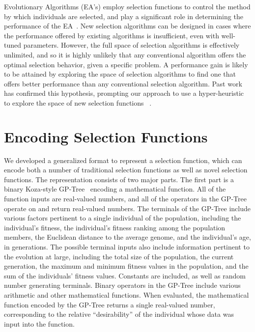 \documentclass[sigconf]{acmart}
\begin{document}
Evolutionary Algorithms (EA's) employ selection functions to control the method by which individuals are selected, and play a significant role in determining the performance of the EA~\citep{woodward2010metaBias}. New selection algorithms can be designed in cases where the performance offered by existing algorithms is insufficient, even with well-tuned parameters. However, the full space of selection algorithms is effectively unlimited, and so it is highly unlikely that any conventional algorithm offers the optimal selection behavior, given a specific problem. A performance gain is likely to be attained by exploring the space of selection algorithms to find one that offers better performance than any conventional selection algorithm. Past work has confirmed this hypothesis, prompting our approach to use a hyper-heuristic to explore the space of new selection functions ~\citep{woodward2011selection}.


\section{Encoding Selection Functions}
\label{Encoding Selection Functions}

We developed a generalized format to represent a selection function, which can encode both a number of traditional selection functions as well as novel selection functions. The representation consists of two major parts. The first part is a binary Koza-style GP-Tree~\citep{koza1994genetic} encoding a mathematical function. All of the function inputs are real-valued numbers, and all of the operators in the GP-Tree operate on and return real-valued numbers. The terminals of the GP-Tree include various factors pertinent to a single individual of the population, including the individual's fitness, the individual's fitness ranking among the population members, the Euclidean distance to the average genome, and the individual's age, in generations. The possible terminal inputs also include information pertinent to the evolution at large, including the total size of the population, the current generation, the maximum and minimum fitness values in the population, and the sum of the individuals' fitness values. Constants are included, as well as random number generating terminals. Binary operators in the GP-Tree include various arithmetic and other mathematical functions. When evaluated, the mathematical function encoded by the GP-Tree returns a single real-valued number, corresponding to the relative ``desirability'' of the individual whose data was input into the function.
\end{document}
